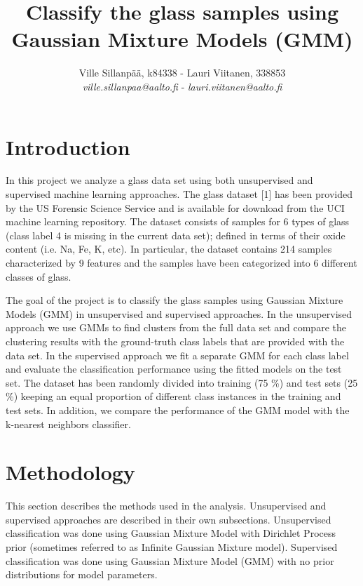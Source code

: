 \documentclass[a4paper]{article}
\title{Classify the glass samples using Gaussian Mixture Models (GMM)}
\author{Ville Sillanpää, k84338 - Lauri Viitanen, 338853 \\ 
       {\it ville.sillanpaa@aalto.fi} -
       {\it lauri.viitanen@aalto.fi}}
\begin{document}
\maketitle
\clearpage


\section{Introduction}

In this project we analyze a glass data set using both unsupervised and
supervised machine learning approaches. The glass dataset [1] has been
provided by the US Forensic Science Service and is available for download from
the UCI machine learning repository. The dataset consists of samples for 6
types of glass (class label 4 is missing in the current data set); defined in
terms of their oxide content (i.e. Na, Fe, K, etc). In particular, the dataset
contains 214 samples characterized by 9 features and the samples have been
categorized into 6 different classes of glass.

\par
The goal of the project is to classify the glass samples using Gaussian
Mixture Models (GMM) in unsupervised and supervised approaches. In the
unsupervised approach we use GMMs to find clusters from the full data set and
compare the clustering results with the ground-truth class labels that are
provided with the data set. In the supervised approach we fit a separate GMM
for each class label and evaluate the classification performance using the
fitted models on the test set. The dataset has been randomly divided into
training (75 \%) and test sets (25 \%) keeping an equal proportion of different
class instances in the training and test sets. In addition, we compare the
performance of the GMM model with the k-nearest neighbors classifier.

\section{Methodology}

This section describes the methods used in the analysis. Unsupervised and supervised approaches are described in their own subsections. Unsupervised classification was done using Gaussian Mixture Model with Dirichlet Process prior (sometimes referred to as Infinite Gaussian Mixture model). Supervised classification was done using Gaussian Mixture Model (GMM) with no prior distributions for model parameters.
\end{document}
